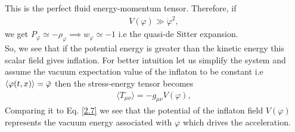 This is the perfect fluid energy-momentum tensor. Therefore, if 
\begin{align}
    V(\varphi) \gg \dot{\varphi}^2 ,\ \label{2.27}
\end{align}
we get $P_{\varphi} \simeq -\rho_{\varphi} \implies w_{\varphi} \simeq -1 $ i.e the quasi-de Sitter expansion.\\
So, we see that if the potential energy is greater than the kinetic energy this scalar field gives inflation. For better intuition let us simplify the system and assume the vacuum expectation value of the inflaton to be constant i.e \(\langle \varphi(t,x) \rangle = \Bar{\varphi}\) then the stress-energy tensor becomes
\begin{align}
    \langle T_{\mu\nu} \rangle  = -g_{\mu\nu} V(\varphi) ,\ \label{2.28}
\end{align}
Comparing it to Eq. \ref{2.7} we see that the potential of the inflaton field $V(\varphi)$  represents the vacuum energy associated with $\varphi$ which drives the acceleration.\\

